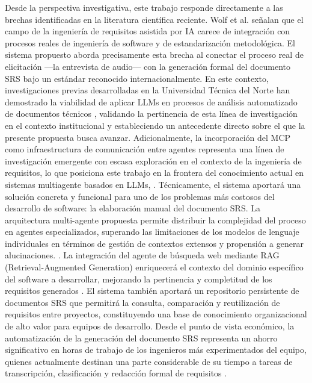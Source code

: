 Desde la perspectiva investigativa, este trabajo responde directamente a las brechas identificadas en la literatura científica reciente. Wolf et al. \cite{Wolf2026} señalan que el campo de la ingeniería de requisitos asistida por IA carece de integración con procesos reales de ingeniería de software y de estandarización metodológica. El sistema propuesto aborda precisamente esta brecha al conectar el proceso real de elicitación —la entrevista de audio— con la generación formal del documento SRS bajo un estándar reconocido internacionalmente. En este contexto, investigaciones previas desarrolladas en la Universidad Técnica del Norte han demostrado la viabilidad de aplicar LLMs en procesos de análisis automatizado de documentos técnicos \cite{Landeta-Lpez2024}, \cite{Guevara-Vega2019} validando la pertinencia de esta línea de investigación en el contexto institucional y estableciendo un antecedente directo sobre el que la presente propuesta busca avanzar. Adicionalmente, la incorporación del MCP como infraestructura de comunicación entre agentes representa una línea de investigación emergente con escasa exploración en el contexto de la ingeniería de requisitos, lo que posiciona este trabajo en la frontera del conocimiento actual en sistemas multiagente basados en LLMs\cite{Guo2024}, \cite{Ray2025}.
Técnicamente, el sistema aportará una solución concreta y funcional para uno de los problemas más costosos del desarrollo de software: la elaboración manual del documento SRS. La arquitectura multi-agente propuesta permite distribuir la complejidad del proceso en agentes especializados, superando las limitaciones de los modelos de lenguaje individuales en términos de gestión de contextos extensos y propensión a generar alucinaciones. \cite{Rahman2024}. La integración del agente de búsqueda web mediante RAG (Retrieval-Augmented Generation) enriquecerá el contexto del dominio específico del software a desarrollar, mejorando la pertinencia y completitud de los requisitos generados \cite{Mukaida2025}. El sistema también aportará un repositorio persistente de documentos SRS que permitirá la consulta, comparación y reutilización de requisitos entre proyectos, constituyendo una base de conocimiento organizacional de alto valor para equipos de desarrollo. 
Desde el punto de vista económico, la automatización de la generación del documento SRS representa un ahorro significativo en horas de trabajo de los ingenieros más experimentados del equipo, quienes actualmente destinan una parte considerable de su tiempo a tareas de transcripción, clasificación y redacción formal de requisitos \cite{Rahman2024}.  

